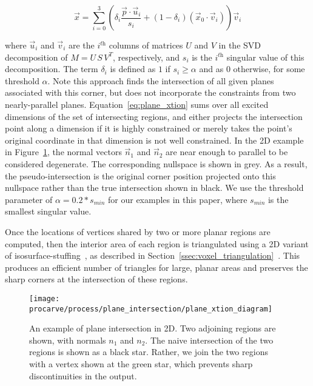 \documentclass[12pt,onecolumn,oneside]{book}
\begin{document}
\begin{equation}
	\vec{x} = \sum_{i = 0}^{3} \left( \delta_i \dfrac{\vec{p} \cdot \vec{u}_i}{s_i} + (1-\delta_i) ( \vec{x}_0 \cdot \vec{v}_i ) \right) \vec{v}_i
	\label{eq:plane_xtion}
\end{equation}

where $\vec{u}_i$ and $\vec{v}_i$ are the $i^{\textit{th}}$ columns of matrices $U$ and $V$ in the SVD decomposition of $M = U \, S \, V^T$, respectively, and $s_i$ is the $i^{\textit{th}}$ singular value of this decomposition.  The term $\delta_i$ is defined as $1$ if $s_i \geq \alpha$ and as $0$ otherwise, for some threshold $\alpha$.  Note this approach finds the intersection of all given planes associated with this corner, but does not incorporate the constraints from two nearly-parallel planes.  Equation~\ref{eq:plane_xtion} sums over all excited dimensions of the set of intersecting regions, and either projects the intersection point along a dimension if it is highly constrained or merely takes the point's original coordinate in that dimension is not well constrained.  In the 2D example in Figure~\ref{fig:plane_xtion}, the normal vectors $\vec{n}_1$ and $\vec{n}_2$ are near enough to parallel to be considered degenerate.  The corresponding nullspace is shown in grey.  As a result, the pseudo-intersection is the original corner position projected onto this nullspace rather than the true intersection shown in black. We use the threshold parameter of $\alpha=0.2 * s_{min}$ for our examples in this paper, where $s_{min}$ is the smallest singular value.

Once the locations of vertices shared by two or more planar regions are computed, then the interior area of each region is triangulated using a 2D variant of isosurface-stuffing~\cite{Isostuffing}, as described in Section~\ref{ssec:voxel_triangulation}~\cite{Turner13}.  This produces an efficient number of triangles for large, planar areas and preserves the sharp corners at the intersection of these regions. 

\begin{figure}
	\centerline{\texttt{[image: procarve/process/plane\_intersection/plane\_xtion\_diagram]}}
	\caption[Computing intersection point for planar regions.]{An example of plane intersection in 2D.  Two adjoining regions are shown, with normals $n_1$ and $n_2$.  The naive intersection of the two regions is shown as a black star.  Rather, we join the two regions with a vertex shown at the green star, which prevents sharp discontinuities in the output.}
	\label{fig:plane_xtion}
\end{figure}
\end{document}
